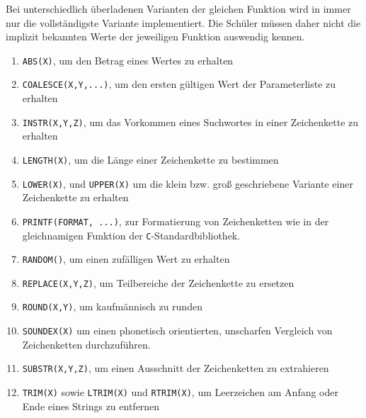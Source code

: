 \begin{enumerate}[resume]
  Bei unterschiedlich überladenen Varianten der gleichen Funktion wird in \idename{} immer nur die vollständigste Variante implementiert. Die Schüler müssen daher nicht die implizit bekannten Werte der jeweiligen Funktion auswendig kennen.
  \begin{enumerate}[noitemsep]
  \item \label{feat:fun-abs} \texttt{ABS(X)}, um den Betrag eines Wertes zu erhalten
  \item \label{feat:fun-coalesce} \texttt{COALESCE(X,Y,...)}, um den ersten gültigen Wert der Parameterliste zu erhalten
  \item \label{feat:fun-instr} \texttt{INSTR(X,Y,Z)}, um das Vorkommen eines Suchwortes in einer Zeichenkette zu erhalten
  \item \label{feat:fun-length} \texttt{LENGTH(X)}, um die Länge einer Zeichenkette zu bestimmen
  \item \label{feat:fun-casing} \texttt{LOWER(X)}, und \texttt{UPPER(X)} um die klein bzw. groß geschriebene Variante einer Zeichenkette zu erhalten
  \item \label{feat:fun-printf} \texttt{PRINTF(FORMAT, ...)}, zur Formatierung von Zeichenketten wie in der gleichnamigen Funktion der \texttt{C}-Standardbibliothek.
  \item \label{feat:fun-random} \texttt{RANDOM()}, um einen zufälligen Wert zu erhalten
  \item \label{feat:fun-replace} \texttt{REPLACE(X,Y,Z)}, um Teilbereiche der Zeichenkette zu ersetzen
  \item \label{feat:fun-round} \texttt{ROUND(X,Y)}, um kaufmännisch zu runden
     \item \label{feat:fun-soundex} \texttt{SOUNDEX(X)} um einen phonetisch orientierten, unscharfen Vergleich von Zeichenketten durchzuführen.
  \item \label{feat:fun-substr} \texttt{SUBSTR(X,Y,Z)}, um einen Ausschnitt der Zeichenketten zu extrahieren
  \item \label{feat:fun-trim} \texttt{TRIM(X)} sowie \texttt{LTRIM(X)} und \texttt{RTRIM(X)}, um Leerzeichen am Anfang oder Ende eines Strings zu entfernen
  \end{enumerate}


\end{enumerate}
